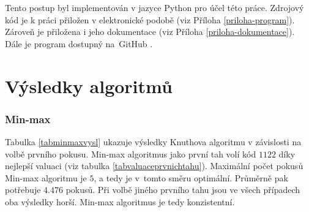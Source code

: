Tento postup byl implementován v jazyce Python pro účel této práce. Zdrojový kód je k práci přiložen v elektronické podobě (viz Příloha \ref{priloha-program}). Zároveň je přiložena i jeho dokumentace (viz Příloha \ref{priloha-dokumentace}). Dále je program dostupný na~GitHub \cite{Simsa_Strategies_for_Mastermind_2025}. 





\section{Výsledky algoritmů}

\subsubsection{Min-max}

Tabulka \ref{tabminmaxvysl} ukazuje výsledky Knuthova algoritmu v závislosti na volbě prvního pokusu. Min-max algoritmus jako první tah volí kód $1122$ díky nejlepší valuaci (viz tabulka \ref{tabvaluaceprvnichtahu}). Maximální počet pokusů Min-max algoritmu je $5$, a tedy je v~tomto směru optimální. Průměrně pak potřebuje $4.476$ pokusů. Při volbě jiného prvního tahu jsou ve všech případech oba výsledky horší. Min-max algoritmus je tedy konzistentní.

